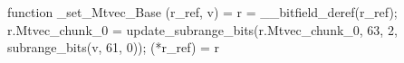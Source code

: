 function _set_Mtvec_Base (r_ref, v) = {
    r = __bitfield_deref(r_ref);
    r.Mtvec_chunk_0 = update_subrange_bits(r.Mtvec_chunk_0, 63, 2, subrange_bits(v, 61, 0));
    (*r_ref) = r
}
